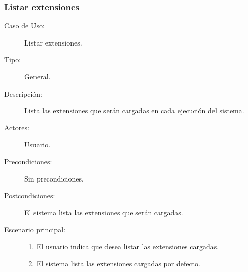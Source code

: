 \subsubsection{Listar extensiones}

\begin{description}
   \item[Caso de Uso:]  Listar extensiones.
   \item[Tipo:] General.
   \item[Descripción:] 
   Lista las extensiones que serán cargadas en cada ejecución del sistema.
   \item[Actores:] 
   Usuario.
   \item[Precondiciones:] 
   Sin precondiciones.
   \item[Postcondiciones:] 
   El sistema lista las extensiones que serán cargadas.
   \item[Escenario principal:] \hfill
   \begin{enumerate}
   \item El usuario indica que desea listar las extensiones cargadas.
   \item El sistema lista las extensiones cargadas por defecto. 
   \end{enumerate}
\end{description}


